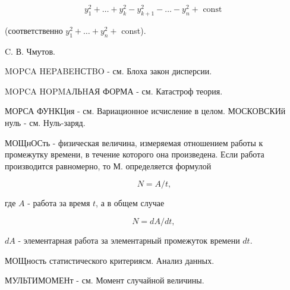 \documentclass[10pt]{article}
\begin{document}
\[

y_{1}^{2}+\ldots+y_{k}^{2}-y_{k+1}^{2}-\ldots-y_{n}^{2}+\text { const }

\]



(соответственно $y_{1}^{2}+\ldots+y_{n}^{2}+$ const).



C. В. Чмутов.



MOPCA HEPABEHСTBO - см. Блоха закон дисперсии.



MOPCA HOPMAЛЬHАЯ ФОРМА - см. Катастроф теория.



МОРСА ФУНКЦия - см. Вариационное исчисление в целом. МОСКОВСКИй нуль - см. Нуль-заряд.



МОЩнОСть - физическая величина, измеряемая отношением работы к промежутку времени, в течение которого она произведена. Если работа производится равномерно, то М. определяется формулой



\[

N=A / t,

\]



где $A$ - работа за время $t$, а в общем случае



\[

N=d A / d t \text {, }

\]



$d A$ - элементарная работа за элементарный промежуток времени $d t$.



МОЩность статистического критериясм. Анализ данных.



МУЛЬТИМОМЕНт - см. Момент случайной величины.
\end{document}
